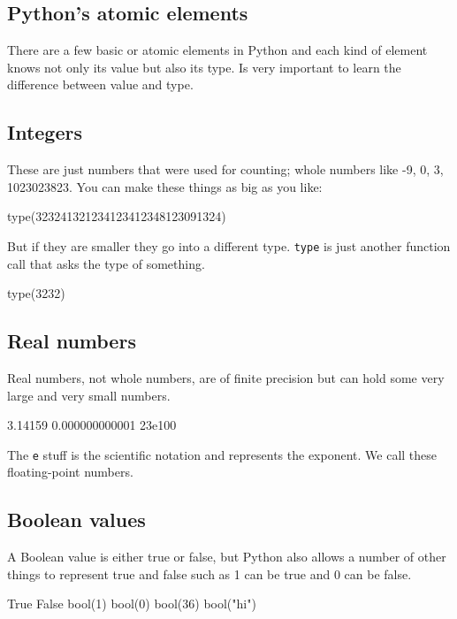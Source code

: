 \begin{fullwidth}
\section{Python's atomic elements}

There are a few basic or atomic elements in Python and each kind of element knows not only its value but also its type. Is very important to learn the difference between value and type.

\subsection{Integers}

These are just numbers that were used for counting; whole numbers like -9, 0, 3, 1023023823. You can make these things as big as you like:
 
\begin{pyconsole}[a]
type(323241321234123412348123091324)
\end{pyconsole}

But if they are smaller they go into a different type. {\tt type} is just another function call that asks the type of something.

\begin{pyconsole}[b]
type(3232)
\end{pyconsole}

\subsection{Real numbers}
 
Real numbers, not whole numbers, are of finite precision but can hold some very large and very small numbers.

\begin{pyconsole}[c]
3.14159
0.000000000001
23e100
\end{pyconsole}

The {\tt e} stuff is the scientific notation and represents the exponent. We call these floating-point numbers.

\subsection{Boolean values}

A Boolean value is either true or false, but Python also allows a number of other things to represent true and false such as 1 can be true and 0 can be false.

\begin{pyconsole}[d]
True
False
bool(1)
bool(0)
bool(36)
bool("hi")
\end{pyconsole}


\end{fullwidth}
